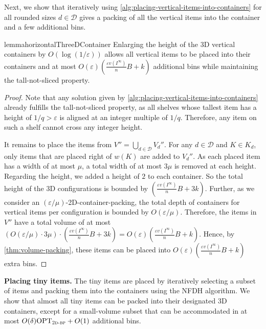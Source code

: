 \documentclass[a4paper,UKenglish,cleveref, autoref, thm-restate]{lipics-v2021}
\newcommand{\eps}{\varepsilon}
\newcommand{\opt}{\mathrm{OPT}}
\newcommand{\twobp}{\textsc{2d-bp}\xspace}
\newcommand{\tin}{tiny\xspace}
\begin{document}
Next, we show that iteratively using \cref{alg:placing-vertical-items-into-containers} for all rounded sizes $d \in \mathcal{D}$ gives a packing of all the vertical items into the container and a few additional bins.


\begin{restatable}{lemma}{horizontalThreeDContainer}
Enlarging the height of the 3D vertical containers by $O(\log(1/\eps))$ allows all vertical items to be placed into their containers and at most $O(\eps)(\frac{\eps v(I^{\infty})}{n} B+k)$ additional bins while maintaining the tall-not-sliced property. 
\end{restatable}

\begin{proof}
Note that any solution given by \cref{alg:placing-vertical-items-into-containers} already fulfills the tall-not-sliced property, as all shelves whose tallest item has a height of $1/q > \eps$ is aligned at an integer multiple of $1/q$. Therefore, any item on such a shelf cannot cross any integer height.

It remains to place the items from $V''= \bigcup_{d \in \mathcal{D}}V_d''$.
For any $d \in \mathcal{D}$ and $K \in K_d$, only items that are placed right of $w(K)$ are added to $V_d''$. As each placed item has a width of at most $\mu$, a total width of at most $3\mu$ is removed at each height.
Regarding the height, we added a height of $2$ to each container.  
So the total height of the 3D configurations is bounded by $(\frac{\eps v(I^{\infty})}{n} B+3k)$.
Further, as we consider an $(\eps/\mu)$-2D-container-packing, the total depth of containers for vertical items per configuration is bounded by $O(\eps/\mu)$.
Therefore, the items in $V''$ have a total volume of at most $(O(\eps/\mu) \cdot 3\mu) \cdot (\frac{\eps v(I^{\infty})}{n} B+3k) = O(\eps)(\frac{\eps v(I^{\infty})}{n} B+k)$.
Hence, by \cref{thm:volume-packing}, these items can be placed into $O(\eps)(\frac{\eps v(I^{\infty})}{n} B+k)$ extra bins.
\end{proof}

\noindent \textbf{Placing \tin items.}
The \tin items are placed by iteratively selecting a subset of items and packing them into the containers using the NFDH algorithm.
We show that almost all \tin items can be packed into their designated 3D containers, except for a small-volume subset that can be accommodated in at most $O(\delta)\opt_{\twobp}+O(1)$ additional bins. 
\end{document}

